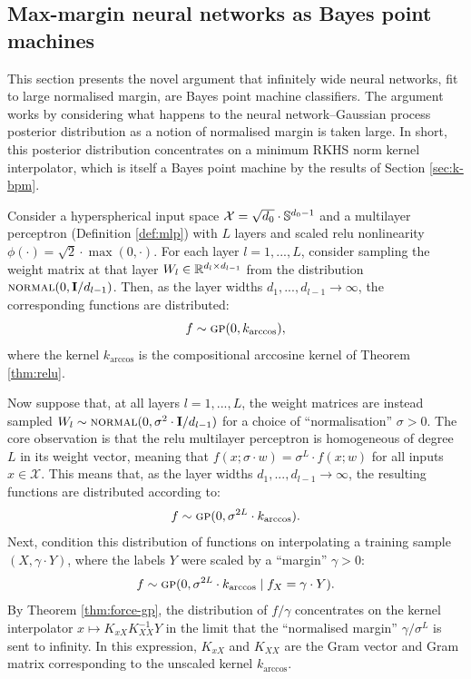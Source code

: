 \begin{refsection}
\section{Max-margin neural networks as Bayes point machines}

This section presents the novel argument that infinitely wide neural networks, fit to large normalised margin, are Bayes point machine classifiers. The argument works by considering what happens to the neural network--Gaussian process posterior distribution as a notion of normalised margin is taken large. In short, this posterior distribution concentrates on a minimum RKHS norm kernel interpolator, which is itself a Bayes point machine by the results of Section \ref{sec:k-bpm}.

Consider a hyperspherical input space $\mathcal{X} = \sqrt{d_0}\cdot\mathbb{S}^{d_0-1}$ and a multilayer perceptron (Definition \ref{def:mlp}) with $L$ layers and scaled relu nonlinearity $\phi(\cdot) = \sqrt{2} \cdot \max(0,\cdot)$. For each layer $l=1,...,L$, consider sampling the weight matrix at that layer $W_l \in \mathbb{R}^{d_l \times d_{l-1}}$ from the distribution $\textsc{normal}(0,\mathbf{I}/d_{l-1})$. Then, as the layer widths $d_1,...,d_{l-1}\to\infty$, the corresponding functions are distributed:
\begin{equation}
    f \sim \textsc{gp}(0,k_\mathrm{arccos}),
\end{equation}
where the kernel $k_\mathrm{arccos}$ is the compositional arccosine kernel of Theorem \ref{thm:relu}.

Now suppose that, at all layers $l=1,...,L$, the weight matrices are instead sampled $W_l \sim \textsc{normal}(0,\sigma^2\cdot\mathbf{I}/d_{l-1})$ for a choice of ``normalisation'' $\sigma>0$. The core observation is that the relu multilayer perceptron is homogeneous of degree $L$ in its weight vector, meaning that $f(x;\sigma\cdot w) = \sigma^L \cdot f(x;w)$ for all inputs $x\in\mathcal{X}$. This means that, as the layer widths $d_1,...,d_{l-1}\to\infty$, the resulting functions are distributed according to:
\begin{equation}
    f \sim \textsc{gp}(0,\sigma^{2L}\cdot k_\mathrm{arccos}).
\end{equation}
Next, condition this distribution of functions on interpolating a training sample $(X,\gamma\cdot Y)$, where the labels $Y$ were scaled by a ``margin'' $\gamma>0$:
\begin{equation}\label{eq:nngp-norm-margin}
    f\sim\textsc{gp}(0, \sigma^{2L} \cdot k_\mathrm{arccos} \mid f_X=\gamma\cdot Y ).
\end{equation}
By Theorem \ref{thm:force-gp}, the distribution of $f/\gamma$ concentrates on the kernel interpolator $x\mapsto K_{xX}K_{XX}^{-1}Y$ in the limit that the ``normalised margin'' $\gamma/\sigma^L$ is sent to infinity. In this expression, $K_{xX}$ and $K_{XX}$ are the Gram vector and Gram matrix corresponding to the unscaled kernel $k_\mathrm{arccos}$.


\end{refsection}

